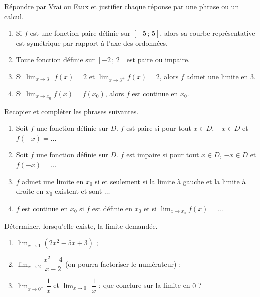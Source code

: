 \documentclass[11pt]{article}
\newcommand{\cle}[1]{{\popxbold\color{popdark}#1}}
\begin{document}
\begin{exercice}
Répondre par Vrai ou Faux et justifier chaque réponse par une phrase ou un calcul.
\begin{enumerate}
\item Si $f$ est une fonction paire définie sur $[-5\,;\,5]$, alors sa courbe représentative est symétrique par rapport à l'axe des ordonnées.
\item Toute fonction définie sur $[-2\,;\,2]$ est paire ou impaire.
\item Si $\displaystyle\lim_{x\to 3^-}f(x)=2$ et $\displaystyle\lim_{x\to 3^+}f(x)=2$, alors $f$ admet une limite en $3$.
\item Si $\displaystyle\lim_{x\to x_0}f(x)=f(x_0)$, alors $f$ est continue en $x_0$.
\end{enumerate}
\end{exercice}

\begin{exercice}
Recopier et compléter les phrases suivantes.
\begin{enumerate}
\item Soit $f$ une fonction définie sur $D$. $f$ est \cle{paire} si pour tout $x\in D$, $-x\in D$ et $f(-x)=\ldots$
\item Soit $f$ une fonction définie sur $D$. $f$ est \cle{impaire} si pour tout $x\in D$, $-x\in D$ et $f(-x)=\ldots$
\item $f$ admet une limite en $x_0$ si et seulement si la limite à gauche et la limite à droite en $x_0$ existent et sont $\ldots$
\item $f$ est \cle{continue} en $x_0$ si $f$ est définie en $x_0$ et si $\displaystyle\lim_{x\to x_0}f(x)=\ldots$
\end{enumerate}
\end{exercice}

\begin{exercice}
Déterminer, lorsqu'elle existe, la limite demandée.
\begin{enumerate}
\item $\displaystyle\lim_{x\to 1}(2x^2-5x+3)$ ;
\item $\displaystyle\lim_{x\to 2}\dfrac{x^2-4}{x-2}$ (on pourra factoriser le numérateur) ;
\item $\displaystyle\lim_{x\to 0^+}\dfrac{1}{x}$ et $\displaystyle\lim_{x\to 0^-}\dfrac{1}{x}$ ; que conclure sur la limite en $0$ ?
\end{enumerate}
\end{exercice}
\end{document}
